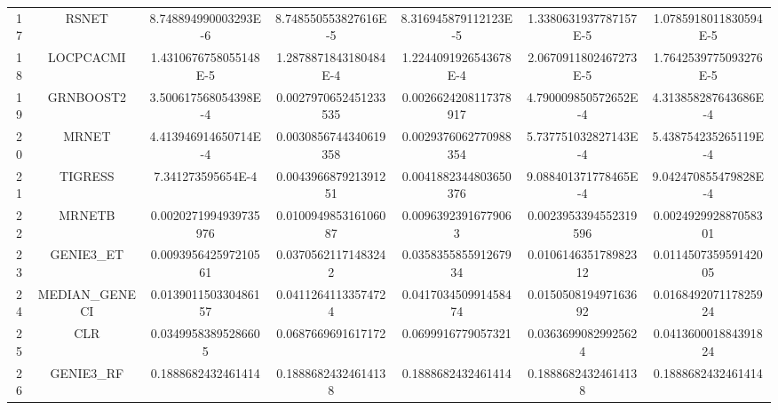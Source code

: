 \documentclass[a4paper,10pt]{article}
\begin{document}
\begin{landscape}
\begin{table}[!htp]
\begin{tabular}{ccccccc}
17&RSNET&8.748894990003293E-6&8.748550553827616E-5&8.316945879112123E-5&1.3380631937787157E-5&1.0785918011830594E-5\\
18&LOCPCACMI&1.4310676758055148E-5&1.2878871843180484E-4&1.2244091926543678E-4&2.0670911802467273E-5&1.7642539775093276E-5\\
19&GRNBOOST2&3.500617568054398E-4&0.0027970652451233535&0.0026624208117378917&4.790009850572652E-4&4.313858287643686E-4\\
20&MRNET&4.413946914650714E-4&0.0030856744340619358&0.0029376062770988354&5.737751032827143E-4&5.438754235265119E-4\\
21&TIGRESS&7.341273595654E-4&0.004396687921391251&0.0041882344803650376&9.088401371778465E-4&9.042470855479828E-4\\
22&MRNETB&0.0020271994939735976&0.010094985316106087&0.00963923916779063&0.0023953394552319596&0.002492992887058301\\
23&GENIE3_ET&0.009395642597210561&0.03705621171483242&0.035835585591267934&0.010614635178982312&0.011450735959142005\\
24&MEDIAN_GENECI&0.013901150330486157&0.04112641133574724&0.041703450991458474&0.015050819497163692&0.016849207117825924\\
25&CLR&0.03499583895286605&0.0687669691617172&0.0699916779057321&0.03636990829925624&0.041360001884391824\\
26&GENIE3_RF&0.1888682432461414&0.18886824324614138&0.1888682432461414&0.18886824324614138&0.1888682432461414\\
\hline
\end{tabular}
\end{table}


\newpage


\end{landscape}
\end{document}
